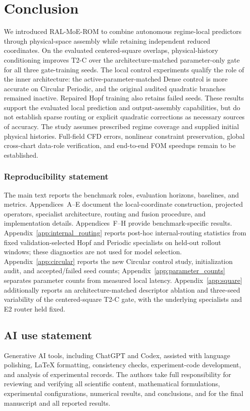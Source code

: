 \documentclass{article}
\begin{document}
\FloatBarrier
\section{Conclusion}
We introduced RAL-MoE-ROM to combine autonomous regime-local predictors
through physical-space assembly while retaining independent reduced
coordinates. On the evaluated centered-square overlaps, physical-history
conditioning improves T2-C over the architecture-matched parameter-only
gate for all three gate-training seeds. The local control experiments
qualify the role of the inner architecture: the active-parameter-matched
Dense control is more accurate on Circular Periodic, and the original
audited quadratic branches remained inactive. Repaired Hopf training
also retains failed seeds. These results support the evaluated local
prediction and output-assembly capabilities, but do not establish sparse
routing or explicit quadratic corrections as necessary sources of
accuracy. The study assumes prescribed regime coverage and supplied
initial physical histories. Full-field CFD errors, nonlinear
constraint preservation, global cross-chart data-role verification,
and end-to-end FOM speedups remain to be established.


\subsubsection*{Reproducibility statement}
The main text reports the benchmark roles, evaluation horizons, baselines, and metrics. Appendices~A--E document the local-coordinate construction, projected operators, specialist architecture, routing and fusion procedure, and implementation details. Appendices~F--H provide benchmark-specific results.
Appendix~\ref{app:internal_routing} reports post-hoc internal-routing statistics
from fixed validation-selected Hopf and Periodic specialists on held-out
rollout windows; these diagnostics are not used for model selection.
Appendix~\ref{app:circular} reports the new Circular control study, initialization audit, and accepted/failed seed counts; Appendix~\ref{app:parameter_counts} separates parameter counts from measured local latency.
Appendix~\ref{app:square} additionally reports an architecture-matched descriptor
ablation and three-seed variability of the centered-square T2-C gate, with the
underlying specialists and E2 router held fixed.

\subsection*{AI use statement}
Generative AI tools, including ChatGPT and Codex, assisted with language polishing, LaTeX formatting, consistency checks, experiment-code development, and analysis of experimental records. The authors take full responsibility for reviewing and verifying all scientific
content, mathematical formulations, experimental configurations, numerical
results, and conclusions, and for the final manuscript and all reported results.
\end{document}
